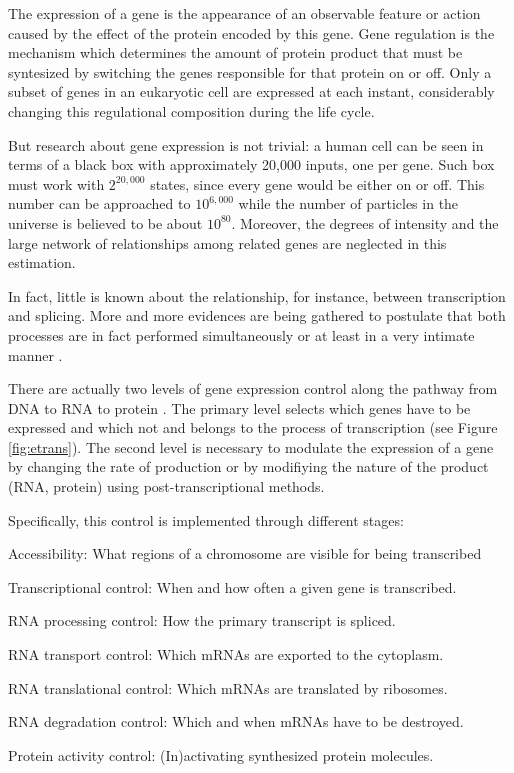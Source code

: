 
The expression of a gene is the appearance of an observable feature or action caused by the effect 
of the protein encoded by this gene. Gene regulation is the mechanism which determines the amount 
of protein product that must be syntesized by switching the genes responsible for that protein on or off. 
Only a subset of genes in an eukaryotic cell are expressed at each instant, considerably changing this
regulational composition during the life cycle.

But research about gene expression is not trivial: a human cell can be seen 
in terms of a black box with approximately 20,000 inputs, one per gene. Such
box must work with $2^{20,000}$ states, since every gene would be either on
or off. This number can be approached to $10^{6,000}$ while the number of
particles in the universe is believed to be about $10^{80}$. Moreover,
the degrees of intensity and the large network of relationships among
related genes are neglected in this estimation.

In fact, little is known about the relationship, for instance, between transcription and
splicing. More and more evidences are being gathered to postulate that both
processes are in fact performed simultaneously or at least in a very intimate
manner \citep{kornblihtt:2005a}.


There are actually two levels of gene expression control
along the pathway from DNA to RNA to protein \citep{brown:1999a}. The primary
level selects which genes have to be expressed and which not and belongs to
the process of transcription (see Figure \ref{fig:etrans}). The second level 
is necessary to modulate the expression of a gene by changing the rate of production 
or by modifiying the nature of the product (RNA, protein) using post-transcriptional 
methods. 

Specifically, this control is implemented through different stages:
\begin{menumerate}
\item
Accessibility: What regions of a chromosome are visible for being transcribed
\item
Transcriptional control: When and how often a given gene is transcribed.
\item
RNA processing control: How the primary transcript is spliced.
\item
RNA transport control: Which mRNAs are exported to the cytoplasm.
\item
RNA translational control: Which mRNAs are translated by ribosomes.
\item
RNA degradation control: Which and when mRNAs have to be destroyed.
\item
Protein activity control: (In)activating synthesized protein molecules.
\end{menumerate}

